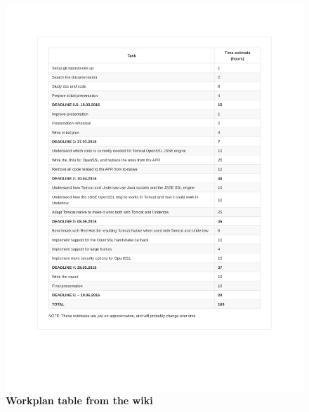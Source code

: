 \documentclass[11pt,a4paper,bibliography=totocnumbered]{scrartcl}
\begin{document}
\begin{figure}[h!]
\begin{center}
\includegraphics[trim=400 120 400 50,scale=0.9]{workplan}
\end{center}
\caption{\textbf{Workplan table from the wiki}}
\label{fig:workplan}
\end{figure}

\FloatBarrier
\end{document}
